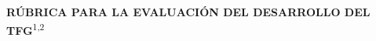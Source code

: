 %
%

\begin{landscape}
\thispagestyle{empty}
\begin{minipage}[t][\dimexpr\textheight-\topskip\relax][t]{\linewidth}
\begin{center}
\textbf{RÚBRICA PARA LA EVALUACIÓN DEL DESARROLLO DEL TFG}\textsuperscript{1,2}
\end{center}
\newcommand{\AnnexTutorReportHeading}{Informe \wordTutorDelOrDeLa{} \wordTutorOrTutora{}\ifCoTutorPresent{ y \wordCoTutorDelOrDeLa{} \wordCoTutorOrCoTutora{}}{}}
\renewcommand{\arraystretch}{1.3} %


\end{minipage}
\end{landscape}
